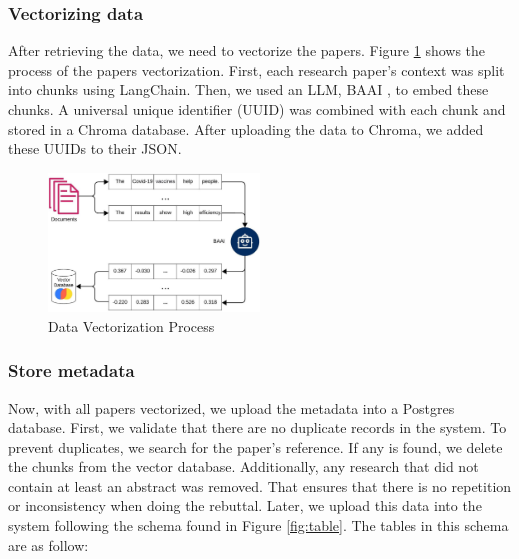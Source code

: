 \subsubsection{Vectorizing data}
After retrieving the data, we need to vectorize the papers. Figure \ref{fig:vector} shows the process of the papers vectorization. First, each research paper’s context was split into chunks using LangChain. Then, we used an LLM, BAAI \cite{bge_embedding}, to embed these chunks. A universal unique identifier (UUID) was combined with each chunk and stored in a Chroma \cite{chroma} database. After uploading the data to Chroma, we added these UUIDs to their JSON. 

\begin{figure}[h]
	\begin{center}
		\includegraphics[width=0.5\textwidth]{figures/Data_vectorization.jpeg} %
	\end{center}
	\caption{Data Vectorization Process} %
	\label{fig:vector}
\end{figure}


\subsubsection{Store metadata}
Now, with all papers vectorized, we upload the metadata into a Postgres database. First, we validate that there are no duplicate records in the system. To prevent duplicates, we search for the paper's reference. If any is found, we delete the chunks from the vector database. Additionally, any research that did not contain at least an abstract was removed. That ensures that there is no repetition or inconsistency when doing the rebuttal. Later, we upload this data into the system following the schema found in Figure \ref{fig:table}. The tables in this schema are as follow:

